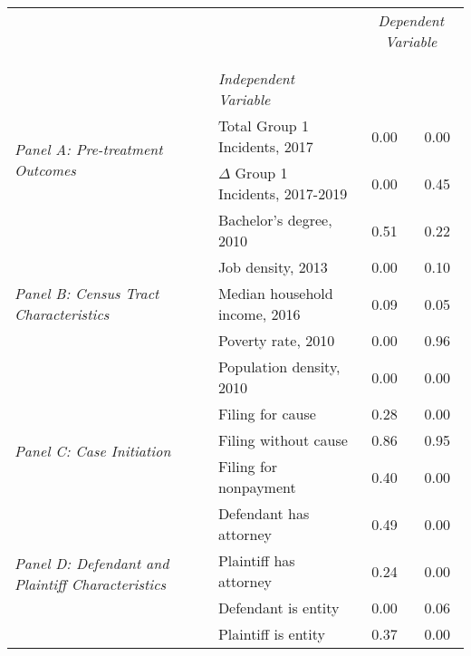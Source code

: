 \begin{tabular}{llcc}
\toprule
 &  & \multicolumn{2}{c}{\textit{Dependent Variable}} \\
\cline{3-4}
\\
 &  &  &  \\
 & \emph{Independent Variable} &  &  \\
\midrule
\multirow[c]{2}{3cm}{\textit{Panel A: Pre-treatment Outcomes}} & Total Group 1 Incidents, 2017 & 0.00 & 0.00 \\
 & $\Delta$ Group 1 Incidents, 2017-2019 & 0.00 & 0.45 \\
\cline{1-4}
\multirow[c]{5}{3cm}{\textit{Panel B: Census Tract Characteristics}} & Bachelor's degree, 2010 & 0.51 & 0.22 \\
 & Job density, 2013 & 0.00 & 0.10 \\
 & Median household income, 2016 & 0.09 & 0.05 \\
 & Poverty rate, 2010 & 0.00 & 0.96 \\
 & Population density, 2010 & 0.00 & 0.00 \\
\cline{1-4}
\multirow[c]{3}{3cm}{\textit{Panel C: Case Initiation}} & Filing for cause & 0.28 & 0.00 \\
 & Filing without cause & 0.86 & 0.95 \\
 & Filing for nonpayment & 0.40 & 0.00 \\
\cline{1-4}
\multirow[c]{4}{3cm}{\textit{Panel D: Defendant and Plaintiff Characteristics}} & Defendant has attorney & 0.49 & 0.00 \\
 & Plaintiff has attorney & 0.24 & 0.00 \\
 & Defendant is entity & 0.00 & 0.06 \\
 & Plaintiff is entity & 0.37 & 0.00 \\
\cline{1-4}
\bottomrule
\end{tabular}
